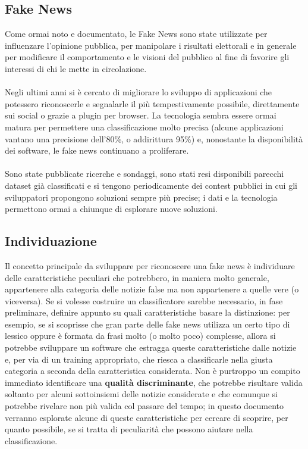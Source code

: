 \documentclass{article}
\begin{document}
    \begin{multicols}{2}
	    \section{Fake News}
			Come ormai noto e documentato, le Fake News sono state utilizzate per influenzare l'opinione pubblica, per manipolare i risultati elettorali e in generale per modificare il comportamento e le visioni del pubblico al fine di favorire gli interessi di chi le mette in circolazione.\\~\\
			Negli ultimi anni si è cercato di migliorare lo sviluppo di applicazioni che potessero riconoscerle e segnalarle il più tempestivamente possibile, direttamente sui social o grazie a plugin per browser. La tecnologia sembra essere ormai matura per permettere una classificazione molto precisa (alcune applicazioni vantano una precisione dell'80\%, o addirittura 95\%) \cite{fakenewschallenge} e, nonostante la disponibilità dei software, le fake news continuano a proliferare.\\~\\	
			Sono state pubblicate ricerche e sondaggi, \cite{fakenewssurvey} \cite{fakenewsdetection} sono stati resi disponibili parecchi dataset già classificati e si tengono periodicamente dei contest pubblici in cui gli sviluppatori propongono soluzioni sempre più precise; i dati e la tecnologia permettono ormai a chiunque di esplorare nuove soluzioni.
			
			\subsection{Individuazione}
			Il concetto principale da sviluppare per riconoscere una fake news è individuare delle caratteristiche peculiari che potrebbero, in maniera molto generale, appartenere alla categoria delle notizie false ma non appartenere a quelle vere (o viceversa). Se si volesse costruire un classificatore sarebbe necessario, in fase preliminare, definire appunto su quali caratteristiche basare la distinzione: per esempio, se si scoprisse che gran parte delle fake news utilizza un certo tipo di lessico oppure è formata da frasi molto (o molto poco) complesse, allora si potrebbe sviluppare un software che estragga queste caratteristiche dalle notizie e, per via di un training appropriato, che riesca a classificarle nella giusta categoria a seconda della caratteristica considerata.
			Non è purtroppo un compito immediato identificare una \textbf{qualità discriminante}, che potrebbe risultare valida soltanto per alcuni sottoinsiemi delle notizie considerate e che comunque si potrebbe rivelare non più valida col passare del tempo; in questo documento verranno esplorate alcune di queste caratteristiche per cercare di scoprire, per quanto possibile, se si tratta di peculiarità che possono aiutare nella classificazione.
	    

\end{multicols}
\end{document}
